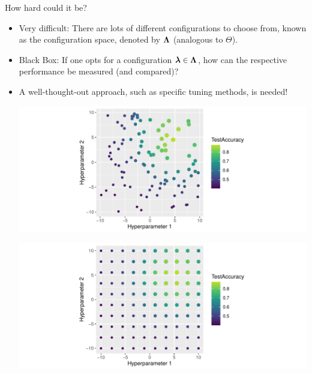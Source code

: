 \documentclass[11pt,compress,t,notes=noshow, xcolor=table]{beamer}
\begin{document}
	\begin{vbframe}{How hard could it be?}
		\begin{itemize}
			\item \small Very difficult: There are lots of different configurations to choose from, known as the configuration space, denoted by $\bm{\Lambda}$ (analogous to $\Theta$).
			\item \small Black Box: If one opts for a configuration $\bm{\lambda} \in \bm{\Lambda}$, how can the respective performance be measured (and compared)? 
			\item \small A well-thought-out approach, such as specific tuning methods, is needed!
			
		\begin{center}
			\vspace{4em}
			\begin{minipage}{0.46\textwidth}
				\includegraphics[width=\textwidth]{figure/cart_tuning_balgos_2.pdf}
			\end{minipage}
			\begin{minipage}{0.46\textwidth}
				\includegraphics[width=\textwidth]{figure/cart_tuning_balgos_1.pdf}
			\end{minipage}
		\end{center}
		
		\end{itemize}
	\end{vbframe}
	
	\endlecture
\end{document}
